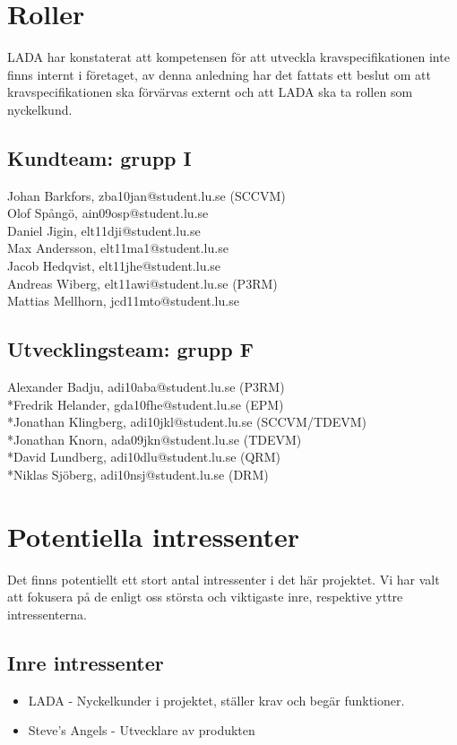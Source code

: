 \documentclass[10pt]{article}
\begin{document}
\section{Roller}
\sloppy
\noindent LADA har konstaterat att kompetensen för att utveckla kravspecifikationen inte finns internt i företaget, av denna anledning har det fattats ett beslut om att kravspecifikationen ska  förvärvas externt och att LADA ska ta rollen som nyckelkund.

\subsection{Kundteam: grupp I}
\noindent
Johan Barkfors, zba10jan@student.lu.se (SCCVM)
\\Olof Spångö, ain09osp@student.lu.se
\\Daniel Jigin, elt11dji@student.lu.se
\\Max Andersson, elt11ma1@student.lu.se
\\Jacob Hedqvist, elt11jhe@student.lu.se
\\Andreas Wiberg, elt11awi@student.lu.se (P3RM)
\\Mattias Mellhorn, jcd11mto@student.lu.se


\subsection{Utvecklingsteam: grupp F}
\noindent
Alexander Badju, adi10aba@student.lu.se (P3RM)	
\\*Fredrik Helander, gda10fhe@student.lu.se (EPM)
\\*Jonathan Klingberg, adi10jkl@student.lu.se (SCCVM/TDEVM)
\\*Jonathan Knorn, ada09jkn@student.lu.se (TDEVM)
\\*David Lundberg, adi10dlu@student.lu.se (QRM)
\\*Niklas Sjöberg, adi10nsj@student.lu.se (DRM)

\section{Potentiella intressenter}
\sloppy
\noindent
Det finns potentiellt ett stort antal intressenter i det här projektet. Vi har valt att fokusera på de enligt oss största och viktigaste inre, respektive yttre intressenterna.

\subsection{Inre intressenter}
\noindent
\begin{itemize}
	\setlength\itemsep{0.1em}
	\item LADA - Nyckelkunder i projektet, ställer krav och begär funktioner.
	\item Steve’s Angels - Utvecklare av produkten
\end{itemize}
\end{document}

